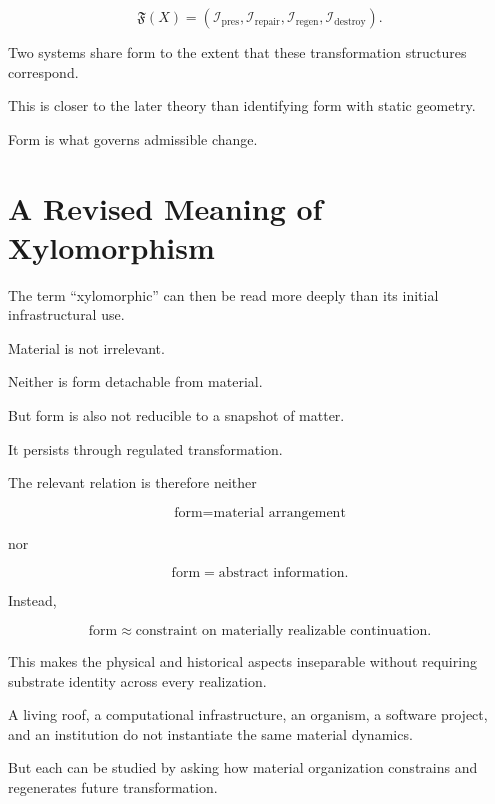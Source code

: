 \documentclass[11pt]{article}
\theoremstyle{remark}
\begin{document}
\begin{equation}
\mathfrak{F}(X)
=
\left(
\mathcal{I}_{\mathrm{pres}},
\mathcal{I}_{\mathrm{repair}},
\mathcal{I}_{\mathrm{regen}},
\mathcal{I}_{\mathrm{destroy}}
\right).
\end{equation}

Two systems share form to the extent that these transformation structures correspond.

This is closer to the later theory than identifying form with static geometry.

Form is what governs admissible change.

\section{A Revised Meaning of Xylomorphism}

The term ``xylomorphic'' can then be read more deeply than its initial infrastructural use.

Material is not irrelevant.

Neither is form detachable from material.

But form is also not reducible to a snapshot of matter.

It persists through regulated transformation.

The relevant relation is therefore neither

\begin{equation}
\text{form}=\text{material arrangement}
\end{equation}

nor

\begin{equation}
\text{form}=\text{abstract information}.
\end{equation}

Instead,

\begin{equation}
\text{form}
\approx
\text{constraint on materially realizable continuation}.
\end{equation}

This makes the physical and historical aspects inseparable without requiring substrate identity across every realization.

A living roof, a computational infrastructure, an organism, a software project, and an institution do not instantiate the same material dynamics.

But each can be studied by asking how material organization constrains and regenerates future transformation.
\end{document}
